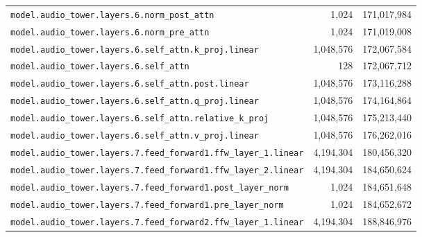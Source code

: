 \documentclass[10pt,a4paper]{article}
\theoremstyle{definition}
\begin{document}
\begin{appendices}
\begin{longtable}{p{9.5cm}rr}
\texttt{model.\allowbreak{}audio\_tower.\allowbreak{}layers.\allowbreak{}6.\allowbreak{}norm\_post\_attn} & 1,024 & 171,017,984 \\
\texttt{model.\allowbreak{}audio\_tower.\allowbreak{}layers.\allowbreak{}6.\allowbreak{}norm\_pre\_attn} & 1,024 & 171,019,008 \\
\texttt{model.\allowbreak{}audio\_tower.\allowbreak{}layers.\allowbreak{}6.\allowbreak{}self\_attn.\allowbreak{}k\_proj.\allowbreak{}linear} & 1,048,576 & 172,067,584 \\
\texttt{model.\allowbreak{}audio\_tower.\allowbreak{}layers.\allowbreak{}6.\allowbreak{}self\_attn} & 128 & 172,067,712 \\
\texttt{model.\allowbreak{}audio\_tower.\allowbreak{}layers.\allowbreak{}6.\allowbreak{}self\_attn.\allowbreak{}post.\allowbreak{}linear} & 1,048,576 & 173,116,288 \\
\texttt{model.\allowbreak{}audio\_tower.\allowbreak{}layers.\allowbreak{}6.\allowbreak{}self\_attn.\allowbreak{}q\_proj.\allowbreak{}linear} & 1,048,576 & 174,164,864 \\
\texttt{model.\allowbreak{}audio\_tower.\allowbreak{}layers.\allowbreak{}6.\allowbreak{}self\_attn.\allowbreak{}relative\_k\_proj} & 1,048,576 & 175,213,440 \\
\texttt{model.\allowbreak{}audio\_tower.\allowbreak{}layers.\allowbreak{}6.\allowbreak{}self\_attn.\allowbreak{}v\_proj.\allowbreak{}linear} & 1,048,576 & 176,262,016 \\
\texttt{model.\allowbreak{}audio\_tower.\allowbreak{}layers.\allowbreak{}7.\allowbreak{}feed\_forward1.\allowbreak{}ffw\_layer\_1.\allowbreak{}linear} & 4,194,304 & 180,456,320 \\
\texttt{model.\allowbreak{}audio\_tower.\allowbreak{}layers.\allowbreak{}7.\allowbreak{}feed\_forward1.\allowbreak{}ffw\_layer\_2.\allowbreak{}linear} & 4,194,304 & 184,650,624 \\
\texttt{model.\allowbreak{}audio\_tower.\allowbreak{}layers.\allowbreak{}7.\allowbreak{}feed\_forward1.\allowbreak{}post\_layer\_norm} & 1,024 & 184,651,648 \\
\texttt{model.\allowbreak{}audio\_tower.\allowbreak{}layers.\allowbreak{}7.\allowbreak{}feed\_forward1.\allowbreak{}pre\_layer\_norm} & 1,024 & 184,652,672 \\
\texttt{model.\allowbreak{}audio\_tower.\allowbreak{}layers.\allowbreak{}7.\allowbreak{}feed\_forward2.\allowbreak{}ffw\_layer\_1.\allowbreak{}linear} & 4,194,304 & 188,846,976 \\

\end{longtable}
\end{appendices}
\end{document}
